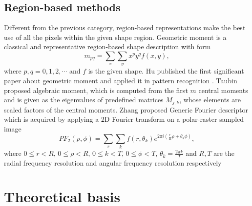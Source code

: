 \documentclass[review,onefignum,onetabnum]{siamonline190516}
\begin{document}
    \subsection{Region-based methods}
        Different from the previous category, region-based representations make the best use of all the pixels within the given shape region. Geometric moment is a classical and representative region-based shape description with form
        \begin{equation*}
            m_{pq} = \sum_x \sum_y x^p y^q f(x, y),
        \end{equation*}
        where $p, q = 0, 1, 2, \cdots$ and $f$ is the given shape. Hu published the first significant paper about geometric moment and applied it in pattern recognition \cite{hu1962visual}. Taubin \etal \cite{taubin1991object,taubin1991recognition} proposed algebraic moment, which is computed from the first $m$ central moments and is given as the eigenvalues of predefined matrices $M_{j, k}$, whose elements are scaled factors of the central moments. Zhang \etal \cite{zhang2002generic} proposed Generic Fourier descriptor which is acquired by applying a 2D Fourier transform on a polar-raster sampled image
        \begin{equation*}
            PF_2(\rho, \phi) = \sum_r \sum_k f(r, \theta_k) e^{2 \pi i (\frac{r}{R} \rho + \theta_k \phi)},
        \end{equation*}
        where $0 \le r < R$, $0 \le \rho < R$, $0 \le k < T$, $0 \le \phi < T$, $\theta_k = \frac{2\pi k}{T}$ and $R, T$ are the radial frequency resolution and angular frequency resolution respectively

\section{Theoretical basis}\label{background}
\end{document}
